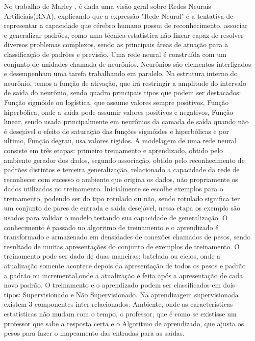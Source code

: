 No trabalho de Marley \cite{Marley}, é dada uma visão geral sobre Redes Neurais Artificiais(RNA), explicando que a expressão "Rede Neural" é a tentativa de representar a capacidade que cérebro humano possui de reconhecimento, associar e generalizar padrões, como uma técnica estatística não-linear capaz de resolver diversos problemas complexos, sendo as principais áreas de atuação para a classificação de padrões e previsão. Uma rede neural é construída com um conjunto de unidades chamada de neurônios. Neurônios são elementos interligados e desempenham uma tarefa trabalhando em paralelo. 
Na estrutura interno do neurônio, temos a função de ativação, que irá restringir a amplitude do intervalo de saída do neurônio, sendo quadro principais tipos que podem ser destacados: Função sigmóide ou logística, que assume valores sempre positivos, Função hiperbólica, onde a saída pode assumir valores positivos e negativos, Função linear, sendo usada principalmente em neurônios da camada de saída quando não é desejável o efeito de saturação das funções sigmóides e hiperbólicas e por ultimo, Função degrau, usa valores rígidos. 
A modelagem de uma rede neural consiste em três etapas: primeiro treinamento e aprendizado, obtido pelo ambiente gerador dos dados, segundo associação, obtido pelo reconhecimento de padrões distintos e terceira generalização, relacionado a capacidade da rede de reconhecer com sucesso o ambiente que origina os dados, não propriamente os dados utilizados no treinamento. Inicialmente se escolhe exemplos para o treinamento, podendo ser do tipo rotulado ou não, sendo rotulado significa ter um conjunto de pares de entrada e saída desejável, nessa etapa os exemplo são usados para validar o modelo testando sua capacidade de generalização. 
O conhecimento é passado no algoritmo de treinamento e o aprendizado é transformado e armazenado em densidades de conexões chamados de pesos, sendo resultado de muitas apresentações do conjunto de exemplos de treinamento. O treinamento pode ser dado de duas maneiras: batelada ou ciclos, onde a atualização somente acontece depois da apresentação de todos os pesos e padrão a padrão ou incremental,onde a atualização é feita após a apresentação de cada novo padrão. 
O treinamento e o aprendizado podem ser classificados em dois tipos: Supervisionado e Não Supervisionado. 
Na aprendizagem supervisionada existem 3 componentes inter-relacionados: Ambiente, onde as características estatísticas não mudam com o tempo, o professor, que é como se existisse um professor que sabe a resposta certa e o Algoritmo de aprendizado, que ajusta os pesos para fazer o mapeamento das entradas para as saídas. 
